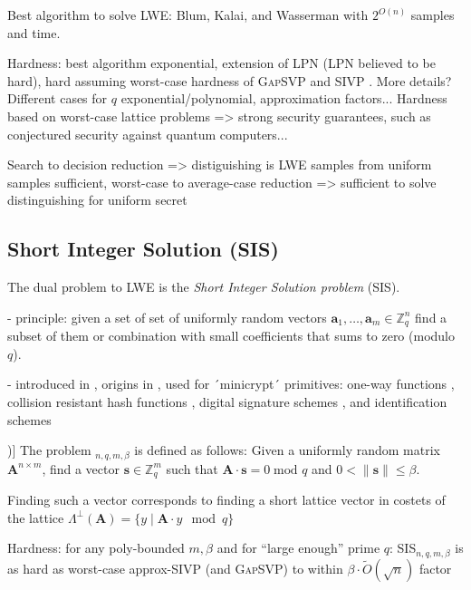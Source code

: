 \documentclass[
  a4paper,  %
  twoside,  %
  bibliography=totoc,
  headsepline,
  cleardoublepage=empty,
  parskip=half,
  draft=false
]{scrbook}
\begin{document}
Best algorithm to solve LWE: Blum, Kalai, and Wasserman \cite{BKW03} with $2^{O(n)}$ samples and time. %

Hardness: best algorithm exponential, extension of LPN (LPN believed to be hard), hard assuming worst-case hardness of \textsc{GapSVP} %
and \textsc{SIVP} \cite{Reg05, Pei09}. More details? Different cases for $q$ exponential/polynomial, approximation factors...
Hardness based on worst-case lattice problems => strong security guarantees, such as conjectured security against quantum computers...
 
Search to decision reduction => distiguishing is LWE samples from uniform samples sufficient, worst-case to average-case reduction => sufficient to solve distinguishing for uniform secret

\subsection{Short Integer Solution (SIS)}
The dual problem to LWE is the \textit{Short Integer Solution problem} (SIS).

- principle: given a set of set of uniformly random vectors $\mathbf{a}_1, \ldots, \mathbf{a}_m \in \mathbb{Z}_q^n$ find a subset of them or combination with small coefficients that sums to zero (modulo $q$). %

- introduced in \cite{MR04}, origins in \cite{Ajt96}, used for ´minicrypt´ primitives: one-way functions \cite{Ajt96}, collision resistant hash functions \cite{GGH96}, digital signature schemes \cite{GPV08, CHKP10}, and identification schemes \cite{MV03, Lyu08, KTX07} %

\begin{definition}[SIS Problem (Adapted from [\citealp{LS15}, Definition 3.1])]
  The problem $_{n, q, m, \beta}$ is defined as follows: Given a uniformly random matrix $\mathbf{A}^{n\times m}$, find a vector $\mathbf{s} \in \mathbb{Z}_q^m$ such that $\mathbf{A} \cdot \mathbf{s} = 0 \; \text{mod } q$ and $0 < \| \mathbf{s}\| \leq \beta$.
\end{definition}

Finding such a vector corresponds to finding a short lattice vector in costets of the lattice $\Lambda^{\perp}(\mathbf{A}) = \{ y \mid \mathbf{A} \cdot y \mod q \}$ %

Hardness: for any poly-bounded $m, \beta$ and for ``large enough'' prime $q$: SIS$_{n, q, m, \beta}$ is as hard as worst-case approx-SIVP (and \textsc{GapSVP}) to within $\beta \cdot \tilde{O}(\sqrt{n})$ factor 
\end{document}
